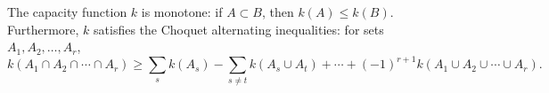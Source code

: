 The capacity function $k$ is monotone: if $A \subset B$, then $k(A) \leq k(B)$. Furthermore, $k$ satisfies the Choquet alternating inequalities: for sets $A_1, A_2, \ldots, A_r$,
$$k(A_1 \cap A_2 \cap \cdots \cap A_r) \geq \sum_s k(A_s) - \sum_{s \neq t} k(A_s \cup A_t) + \cdots + (-1)^{r+1} k(A_1 \cup A_2 \cup \cdots \cup A_r).$$
